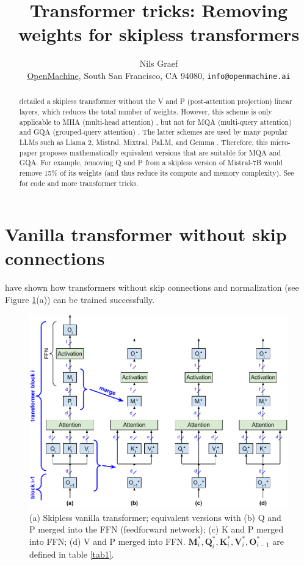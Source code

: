 \documentclass{article}
\title{Transformer tricks: Removing weights for skipless transformers}
\author{Nils Graef \\ \href{https://openmachine.ai}{OpenMachine},
  South San Francisco, CA 94080, \texttt{info@openmachine.ai}}
\newcommand{\mat}[1]{\mathbf{#1}}  %
\def\Q{\mat{Q}_i}
\def\K{\mat{K}_i}
\def\V{\mat{V}_i}
\def\O{\mat{O}_{i-1}}
\def\M{\mat{M}_i}
\begin{document}
 \maketitle

\begin{abstract}
\citet{simplified} detailed a skipless transformer without the V and P (post-attention projection) linear layers, which reduces the total number of weights. However, this scheme is only applicable to MHA (multi-head attention) \cite{vanilla}, but not for MQA (multi-query attention) \cite{MQA} and GQA (grouped-query attention) \cite{GQA}. The latter schemes are used by many popular LLMs such as Llama 2, Mistral, Mixtral, PaLM, and Gemma \cite{Llama2, mistral, mixtral, PaLM, gemma}. Therefore, this micro-paper \cite{micro-paper} proposes mathematically equivalent versions that are suitable for MQA and GQA. For example, removing Q and P from a skipless version of Mistral-7B would remove 15\% of its weights (and thus reduce its compute and memory complexity). See \cite{tricks, precompute} for code and more transformer tricks.
\end{abstract}

\section{Vanilla transformer without skip connections}

\citet{skipless} have shown how transformers without skip connections and normalization (see Figure \ref{fig1}(a)) can be trained successfully.

\begin{figure}[h!] \centering %
  \includegraphics[scale=0.90]{../doc/fig/removeWeights_fig1.pdf}
  \caption{(a) Skipless vanilla transformer; equivalent versions with (b) Q and P merged into the FFN (feedforward network); (c) K and P merged into FFN; (d) V and P merged into FFN. $\M^*, \Q^*, \K^*, \V^*, \O^*$ are defined in table \ref{tab1}.}
\label{fig1} \end{figure}
\end{document}
